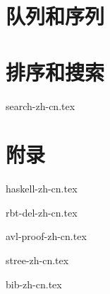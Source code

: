 \documentclass[UTF8, a4paper,twoside]{book} %
\begin{document}





\part{队列和序列}




\part{排序和搜索}


{search-zh-cn.tex}

\part{附录}
\appendix
\noappendicestocpagenum
\addappheadtotoc



{haskell-zh-cn.tex}

{rbt-del-zh-cn.tex}

{avl-proof-zh-cn.tex}

{stree-zh-cn.tex}

{bib-zh-cn.tex}

%

\printindex
\end{document}
